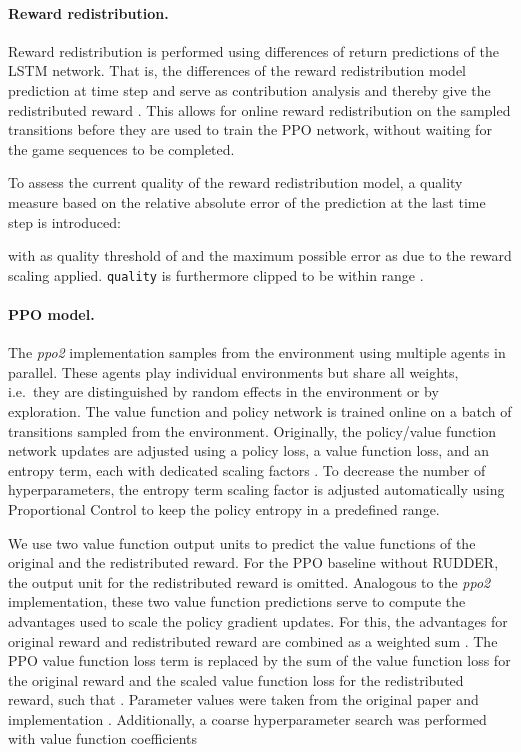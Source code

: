 \documentclass{article}
\begin{document}
\begin{appendices}
\paragraph{Reward redistribution.}
Reward redistribution is performed using differences of return predictions of the LSTM network.
That is, the differences of the reward redistribution model prediction 
at time step  and  serve as contribution analysis and thereby give the redistributed reward .
This allows for online reward redistribution on the sampled transitions
before they are used to train the PPO network,
without waiting for the game sequences to be completed.

To assess the current quality of the reward redistribution model,
a quality measure based on the relative absolute error of 
the prediction  at the last time step  is introduced:

with  as quality threshold of  and the maximum
possible error  as  due to the reward scaling applied.
{\tt quality} is furthermore clipped to be within range .

\paragraph{PPO model.}
\label{c:ppomodel}
The {\em ppo2} implementation \cite{Dhariwal:17}
samples from the environment using multiple agents in parallel.
These agents play individual environments but share all weights,
i.e.\ they are distinguished by random effects in the environment
or by exploration.
The value function and policy network is trained online on a batch of transitions
sampled from the environment.
Originally, the policy/value function network updates are adjusted using a policy loss,
a value function loss, and an entropy term, each with dedicated scaling factors \cite{Schulman:17}.
To decrease the number of hyperparameters,
the entropy term scaling factor is adjusted automatically using Proportional Control
to keep the policy entropy in a predefined range.

We use two value function output units to predict the value functions of 
the original and the redistributed reward.
For the PPO baseline without RUDDER, the output unit for the redistributed reward is omitted.
Analogous to the {\em ppo2} implementation, these two value function predictions 
serve to compute the advantages used to scale the policy gradient updates.
For this, the advantages for original reward  and redistributed reward  are combined
as a weighted sum .
The PPO value function loss term  is replaced by the sum of the value function 
loss  for the original reward  and
the scaled value function  loss  for the redistributed reward,
such that .
Parameter values were taken from
the original paper \cite{Schulman:17} and implementation \cite{Dhariwal:17}.
Additionally, a coarse hyperparameter search was performed with value function coefficients 


\end{appendices}
\end{document}
